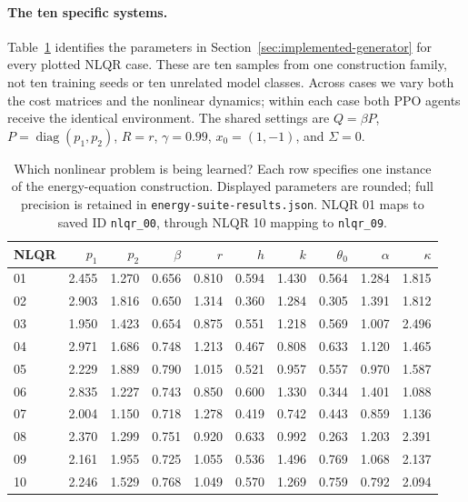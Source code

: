 \documentclass[11pt]{article}
\begin{document}
\paragraph{The ten specific systems.}
Table~\ref{tab:generated-parameters} identifies the parameters in
Section~\ref{sec:implemented-generator} for every plotted NLQR case. These are ten
samples from one construction family, not ten training seeds or ten unrelated model
classes. Across cases we vary both the cost matrices and the nonlinear dynamics;
within each case both PPO agents receive the identical environment.
The shared settings are $Q=\beta P$, $P=\operatorname{diag}(p_1,p_2)$, $R=r$,
$\gamma=0.99$, $x_0=(1,-1)$, and $\Sigma=0$.
\begin{table}[H]
\centering\small
\begin{tabular}{@{}lrrrrrrrrr@{}}
\toprule
NLQR & $p_1$ & $p_2$ & $\beta$ & $r$ & $h$ & $k$ & $\theta_0$ & $\alpha$ & $\kappa$ \\
\midrule
01 & 2.455 & 1.270 & 0.656 & 0.810 & 0.594 & 1.430 & 0.564 & 1.284 & 1.815 \\
02 & 2.903 & 1.816 & 0.650 & 1.314 & 0.360 & 1.284 & 0.305 & 1.391 & 1.812 \\
03 & 1.950 & 1.423 & 0.654 & 0.875 & 0.551 & 1.218 & 0.569 & 1.007 & 2.496 \\
04 & 2.971 & 1.686 & 0.748 & 1.213 & 0.467 & 0.808 & 0.633 & 1.120 & 1.465 \\
05 & 2.229 & 1.889 & 0.790 & 1.015 & 0.521 & 0.957 & 0.557 & 0.970 & 1.587 \\
06 & 2.835 & 1.227 & 0.743 & 0.850 & 0.600 & 1.330 & 0.344 & 1.401 & 1.088 \\
07 & 2.004 & 1.150 & 0.718 & 1.278 & 0.419 & 0.742 & 0.443 & 0.859 & 1.136 \\
08 & 2.370 & 1.299 & 0.751 & 0.920 & 0.633 & 0.992 & 0.263 & 1.203 & 2.391 \\
09 & 2.161 & 1.955 & 0.725 & 1.055 & 0.536 & 1.496 & 0.769 & 1.068 & 2.137 \\
10 & 2.246 & 1.529 & 0.768 & 1.049 & 0.570 & 1.269 & 0.759 & 0.792 & 2.094 \\
\bottomrule
\end{tabular}
\caption{Which nonlinear problem is being learned? Each row specifies one instance
of the energy-equation construction. Displayed parameters are rounded; full precision
is retained in \texttt{energy-suite-results.json}. NLQR 01 maps to saved ID
\texttt{nlqr\_00}, through NLQR 10 mapping to \texttt{nlqr\_09}.}
\label{tab:generated-parameters}
\end{table}
\end{document}
